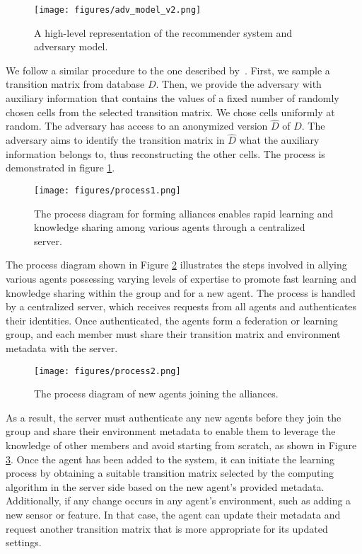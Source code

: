 \documentclass{article}
\begin{document}

\begin{figure}
    \centering
   \texttt{[image: figures/adv\_model\_v2.png]}
    
\caption{A high-level representation of the recommender system and adversary model.
    }
    \label{fig:adv_model}
\end{figure}




We follow a similar procedure to the one described by~\citet{Narayanan2008}. First, we sample a transition matrix from database $D$. Then, we provide the adversary with auxiliary information that contains the values of a fixed number of randomly chosen cells from the selected transition matrix. We chose cells uniformly at random. The adversary has access to an anonymized version $\hat{D}$ of $D$. The adversary aims to identify the transition matrix in $\hat{D}$ what the auxiliary information belongs to, thus reconstructing the other cells. The process is demonstrated in figure \ref{fig:adv_model}.

\begin{figure}
    \centering
   \texttt{[image: figures/process1.png]}
    \caption{The process diagram for forming alliances enables rapid learning and knowledge sharing among various agents through a centralized server.}
    \label{fig:process1}
\end{figure}
The process diagram shown in Figure \ref{fig:process1} illustrates the steps involved in allying various agents possessing varying levels of expertise to promote fast learning and knowledge sharing within the group and for a new agent. The process is handled by a centralized server, which receives requests from all agents and authenticates their identities. Once authenticated, the agents form a federation or learning group, and each member must share their transition matrix and environment metadata with the server.
\begin{figure}
    \centering
   \texttt{[image: figures/process2.png]}
    \caption{The process diagram of new agents joining the alliances.}
    \label{fig:process2}
\end{figure}
 As a result, the server must authenticate any new agents before they join the group and share their environment metadata to enable them to leverage the knowledge of other members and avoid starting from scratch, as shown in Figure \ref{fig:process2}. Once the agent has been added to the system, it can initiate the learning process by obtaining a suitable transition matrix selected by the computing algorithm in the server side based on the new agent's provided metadata. Additionally, if any change occurs in any agent's environment, such as adding a new sensor or feature. In that case, the agent can update their metadata and request another transition matrix that is more appropriate for its updated settings.
\end{document}
